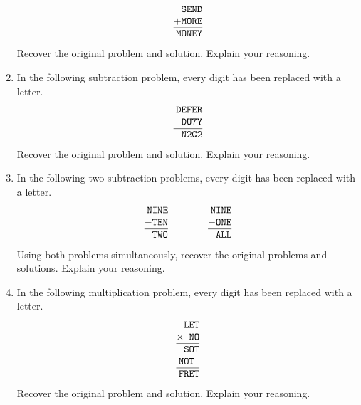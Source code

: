 \begin{problems}
\begin{enumerate}
\[\begin{tabular}{@{}r@{}}
\texttt{SEND}\\
$+$\texttt{MORE}\\ \hline
\texttt{MONEY}
\end{tabular}
\]
Recover the original problem and solution. Explain your reasoning.
\item In the following subtraction problem, every digit has been
  replaced with a letter.
\[
\begin{tabular}{@{}r@{}}
\texttt{DEFER}\\
$-$\texttt{DU7Y}\\ \hline
\texttt{N2G2}
\end{tabular}
\]
Recover the original problem and solution. Explain your reasoning.
\item In the following two subtraction problems, every digit has been
  replaced with a letter.
\[
\begin{tabular}{@{}r@{}}
\texttt{NINE}\\
$-$\texttt{TEN}\\ \hline
\texttt{TWO}
\end{tabular}
\qquad\qquad
\begin{tabular}{@{}r@{}}
\texttt{NINE}\\
$-$\texttt{ONE}\\ \hline
\texttt{ALL}
\end{tabular}
\]
Using both problems simultaneously, recover the original problems and
solutions. Explain your reasoning.
\item In the following multiplication problem, every digit has been
  replaced with a letter.
\[
\begin{tabular}{@{}r@{}}
\texttt{LET}\\
$\times$\texttt{ NO}\\ \hline
\texttt{SOT}\\
\texttt{NOT$~$}\\
\hline
\texttt{FRET}
\end{tabular}
\]
Recover the original problem and solution. Explain your reasoning.



\end{enumerate}
\end{problems}
